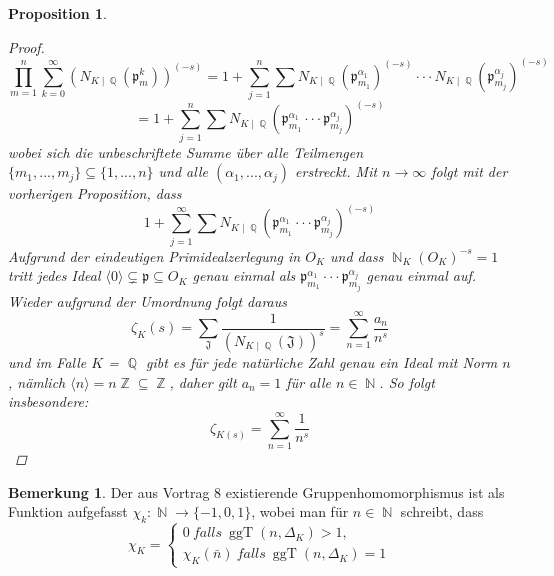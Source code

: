 \documentclass[10pt,a4paper]{article}
\theoremstyle{plain}
\newtheorem{prop}[thm]{Proposition}
\theoremstyle{definition}
\newtheorem*{note}{Bemerkung}
\theoremstyle{remark}
\DeclareMathOperator{\Q}{\mathbb{Q}}
\DeclareMathOperator{\Z}{\mathbb{Z}}
\DeclareMathOperator{\N}{\mathbb{N}}
\DeclareMathOperator{\ggT}{ggT}
\begin{document}
\begin{prop}
\begin{proof}
$$\prod_{m=1}^{n}\sum_{k=0}^{\infty}(N_{K\mid \Q}(\mathfrak{p}_m^k))^{(-s)}=1+\sum_{j=1}^{n}\sum N_{K\mid \Q}(\mathfrak{p}_{m_1}^{\alpha_1})^{(-s)}\cdot\cdot\cdot N_{K\mid \Q}(\mathfrak{p}_{m_j}^{\alpha_j})^{(-s)}$$ $$=1+\sum_{j=1}^{n}\sum N_{K\mid \Q}(\mathfrak{p}_{m_1}^{\alpha_1}\cdot\cdot\cdot\mathfrak{p}_{m_j}^{\alpha_j})^{(-s)}$$
wobei sich die unbeschriftete Summe über alle Teilmengen $\{m_{1},...,m_{j}\}\subseteq \{ 1,...,n\}$ und alle $(\alpha_1,...,\alpha_j)$ erstreckt. Mit $n \rightarrow \infty$ folgt mit der vorherigen Proposition, dass $$1+\sum_{j=1}^{\infty}\sum N_{K\mid \Q}(\mathfrak{p}_{m_1}^{\alpha_1}\cdot\cdot\cdot\mathfrak{p}_{m_j}^{\alpha_j})^{(-s)}$$
Aufgrund der eindeutigen Primidealzerlegung in $O_K$ und dass $\N_K(O_K)^{-s}=1$ tritt jedes Ideal $\langle0\rangle\subsetneq \mathfrak{p} \subseteq O_{\textit{K}}$ genau einmal als $\mathfrak{p}_{m_1}^{\alpha_1}\cdot\cdot\cdot\mathfrak{p}_{m_j}^{\alpha_j}$ genau einmal auf. Wieder aufgrund der Umordnung folgt daraus $$\zeta_{K}(s) = \sum_{\mathfrak{J}}\frac{1}{(N_{K\mid\Q}(\mathfrak{J}))^s}=\sum_{n=1}^{\infty}\frac{a_n}{n^s}$$ und im Falle $\textit{K}$ = $\Q$ gibt es für jede natürliche Zahl genau ein Ideal mit Norm $n$, nämlich $\langle n\rangle=n\Z\subseteq \Z$, daher gilt $a_n=1$ für alle $n\in \N$. So folgt insbesondere: $$\zeta_{K(s)}= \sum_{n=1}^{\infty}\frac{1}{n^s}$$

\end{proof}
\end{prop}

\begin{note}

Der aus Vortrag 8 existierende Gruppenhomomorphismus ist als Funktion aufgefasst $\chi_k \colon \N \rightarrow \{-1,0,1 \}$, wobei man für $n \in \N$ schreibt, dass $$\chi_K=\begin{cases}0 \ falls \ \ggT(n,\Delta_K) >1,\\\chi_{K}(\bar{n})\ falls\ \ggT(n,\Delta_K) =1\end{cases}$$

\end{note}
\end{document}
